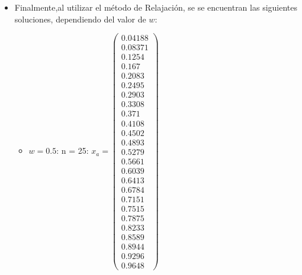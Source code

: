 \documentclass{udpreport}
\begin{document}
\begin{enumerate}
\begin{enumerate}
\begin{itemize}
				\item Finalmente,al utilizar el método de Relajación, se se encuentran las siguientes soluciones, dependiendo del valor de $w$:
				\begin{itemize}
				\item $w = 0.5$:
				n = 25: $x_{a} = \left(\begin{array}{c} 0.04188\\ 0.08371\\ 0.1254\\ 0.167\\ 0.2083\\ 0.2495\\ 0.2903\\ 0.3308\\ 0.371\\ 0.4108\\ 0.4502\\ 0.4893\\ 0.5279\\ 0.5661\\ 0.6039\\ 0.6413\\ 0.6784\\ 0.7151\\ 0.7515\\ 0.7875\\ 0.8233\\ 0.8589\\ 0.8944\\ 0.9296\\ 0.9648 \end{array}\right)$ 

\end{itemize}
\end{itemize}
\end{enumerate}
\end{enumerate}
\end{document}
